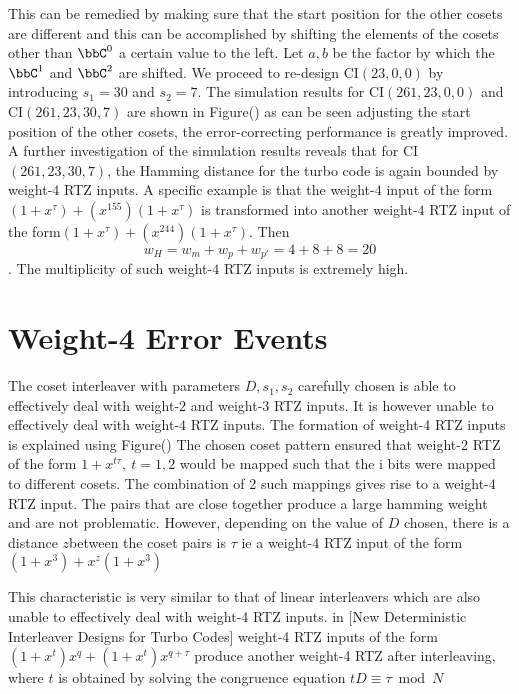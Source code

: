 \documentclass[11pt, oneside, dvipdfmx]{book}
\begin{document}
This can be remedied by making sure that the start position for the other cosets are different and this can be accomplished by shifting the elements of the cosets other than $\bbC^0$ a certain value to the left. Let $a,b$ be the factor by which the $\bbC^1$ and $\bbC^2$ are shifted.  We proceed to re-design  CI$(23,0,0)$  by introducing $s_1=30$ and $s_2=7$.
The simulation results for CI$(261,23,0,0)$ and CI$(261,23,30,7)$ are shown in Figure() as can be seen adjusting the start position of the other cosets, the error-correcting performance is greatly improved. A further investigation of the simulation results reveals that for CI$(261,23,30,7)$, the Hamming distance for the turbo code is again bounded by weight-$4$ RTZ inputs. A specific example is that the weight-$4$ input of the form $(1+x^{\tau})+(x^{155})(1+x^{\tau})$ is transformed into another weight-$4$ RTZ input of the form$ (1+x^{\tau})+(x^{244})(1+x^{\tau})$. Then $$w_H=w_m+w_p+w_{p'}=4+8+8=20$$. The multiplicity of such weight-$4$ RTZ inputs is extremely high. 

\section{Weight-4 Error Events}
The coset interleaver with parameters $D,s_1,s_2$ carefully chosen is able to effectively deal with weight-$2$ and weight-$3$ RTZ inputs. It is however unable to effectively deal with weight-$4$ RTZ inputs. The formation of weight-4 RTZ inputs is explained using Figure()
The chosen coset pattern ensured that weight-$2$ RTZ of the form $1+x^{t\tau},~t=1,2$ would be mapped such that the i bits were mapped to different cosets. The combination of 2 such mappings gives rise to a weight-$4$ RTZ input. The pairs that are close together produce a large hamming weight and are not problematic. However, depending on the value of $D$ chosen, there is a distance $z$between the coset pairs is $\tau$ ie a weight-$4$ RTZ input of the form $(1+x^3) +x^z(1+x^3)$

This characteristic is very similar to that of linear interleavers which are also unable to effectively deal with weight-4 RTZ inputs. in [New Deterministic Interleaver Designs for
Turbo Codes] weight-4 RTZ inputs of the form $(1+x^t)x^q + (1+x^t)x^{q+\tau}$ produce another weight-4 RTZ after interleaving, where $t$ is obtained by solving the congruence equation $tD\equiv \tau \bmod N$

 
\end{document}
